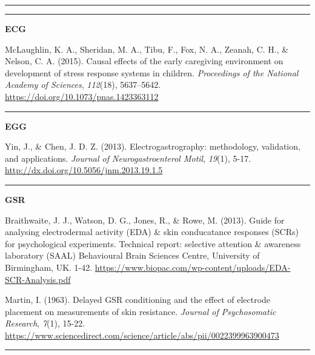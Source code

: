 \documentclass[]{book}
\begin{document}
\begin{center}\rule{0.5\linewidth}{\linethickness}\end{center}

\begin{center}\rule{0.5\linewidth}{\linethickness}\end{center}

\textbf{ECG}

McLaughlin, K. A., Sheridan, M. A., Tibu, F., Fox, N. A., Zeanah, C. H., \& Nelson, C. A. (2015). Causal effects of the early caregiving environment on development of stress response systems in children. \emph{Proceedings of the National Academy of Sciences}, \emph{112}(18), 5637--5642.\\
\url{https://doi.org/10.1073/pnas.1423363112}

\begin{center}\rule{0.5\linewidth}{\linethickness}\end{center}

\textbf{EGG}

Yin, J., \& Chen, J. D. Z. (2013). Electrogastrography: methodology, validation, and applications. \emph{Journal of Neurogastroenterol Motil}, \emph{19}(1), 5-17. \url{http://dx.doi.org/10.5056/jnm.2013.19.1.5}

\begin{center}\rule{0.5\linewidth}{\linethickness}\end{center}

\textbf{GSR}

Braithwaite, J. J., Watson, D. G., Jones, R., \& Rowe, M. (2013). Guide for analysing electrodermal activity (EDA) \& skin conducatance responses (SCRs) for psychological experiments. Technical report: selective attention \& awareness laboratory (SAAL) Behavioural Brain Sciences Centre, University of Birmingham, UK. 1-42. \url{https://www.biopac.com/wp-content/uploads/EDA-SCR-Analysis.pdf}

Martin, I. (1963). Delayed GSR conditioning and the effect of electrode placement on measurements of skin resistance. \emph{Journal of Psychosomatic Research}, \emph{7}(1), 15-22.\\
\url{https://www.sciencedirect.com/science/article/abs/pii/0022399963900473}

\begin{center}\rule{0.5\linewidth}{\linethickness}\end{center}


\end{document}
